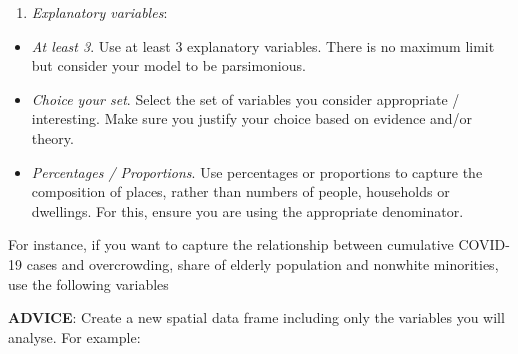 \documentclass[
]{book}
\newenvironment{Shaded}{\begin{snugshade}}{\end{snugshade}}
\newcommand{\CommentTok}[1]{\textcolor[rgb]{0.56,0.35,0.01}{\textit{#1}}}
\newcommand{\DataTypeTok}[1]{\textcolor[rgb]{0.13,0.29,0.53}{#1}}
\newcommand{\KeywordTok}[1]{\textcolor[rgb]{0.13,0.29,0.53}{\textbf{#1}}}
\newcommand{\NormalTok}[1]{#1}
\newcommand{\OperatorTok}[1]{\textcolor[rgb]{0.81,0.36,0.00}{\textbf{#1}}}
\newcommand{\StringTok}[1]{\textcolor[rgb]{0.31,0.60,0.02}{#1}}
\providecommand{\tightlist}{%
  \setlength{\itemsep}{0pt}\setlength{\parskip}{0pt}}
\begin{document}
\begin{enumerate}
\def\labelenumi{\arabic{enumi}.}
\setcounter{enumi}{1}
\tightlist
\item
  \emph{Explanatory variables}:
\end{enumerate}

\begin{itemize}
\item
  \emph{At least 3}. Use at least 3 explanatory variables. There is no maximum limit but consider your model to be parsimonious.
\item
  \emph{Choice your set}. Select the set of variables you consider appropriate / interesting. Make sure you justify your choice based on evidence and/or theory.
\item
  \emph{Percentages / Proportions}. Use percentages or proportions to capture the composition of places, rather than numbers of people, households or dwellings. For this, ensure you are using the appropriate denominator.
\end{itemize}

For instance, if you want to capture the relationship between cumulative COVID-19 cases and overcrowding, share of elderly population and nonwhite minorities, use the following variables

\begin{Shaded}
\end{Shaded}

\textbf{ADVICE}: Create a new spatial data frame including only the variables you will analyse. For example:
\end{document}
